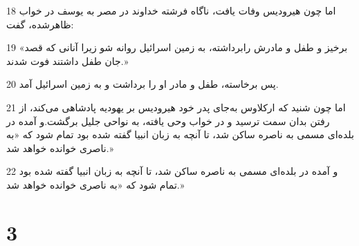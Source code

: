 \par 18 اما چون هیرودیس وفات یافت، ناگاه فرشته خداوند در مصر به یوسف در خواب ظاهرشده، گفت:
\par 19 «برخیز و طفل و مادرش رابرداشته، به زمین اسرائیل روانه شو زیرا آنانی که قصد جان طفل داشتند فوت شدند.»
\par 20 پس برخاسته، طفل و مادر او را برداشت و به زمین اسرائیل آمد.
\par 21 اما چون شنید که ارکلاوس به‌جای پدر خود هیرودیس بر یهودیه پادشاهی می‌کند، از رفتن بدان سمت ترسید و در خواب وحی یافته، به نواحی جلیل برگشت.و آمده در بلده‌ای مسمی به ناصره ساکن شد، تا آنچه به زبان انبیا گفته شده بود تمام شود که «به ناصری خوانده خواهد شد.»
\par 22 و آمده در بلده‌ای مسمی به ناصره ساکن شد، تا آنچه به زبان انبیا گفته شده بود تمام شود که «به ناصری خوانده خواهد شد.»

\chapter{3}

